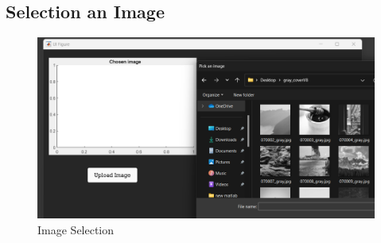\subsection{Selection an Image}
\begin{figure}[H]
    \centering
    \includegraphics[width=140mm]{./img/selectsample.png}
    \caption{Image Selection}
\end{figure}


